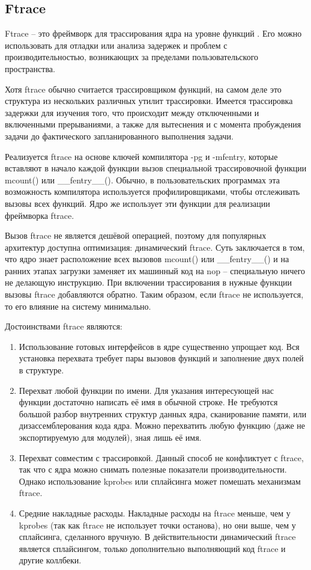 	\subsection*{Ftrace}
		Ftrace -- это фреймворк для трассирования ядра на уровне функций \cite{ftrace}.
		Его можно использовать для отладки или анализа задержек и проблем с производительностью, 
		возникающих за пределами пользовательского пространства.

		Хотя ftrace обычно считается трассировщиком функций, 
		на самом деле это структура из нескольких различных утилит трассировки. 
		Имеется трассировка задержки для изучения того, 
		что происходит между отключенными и включенными прерываниями, 
		а также для вытеснения и с момента пробуждения задачи до фактического запланированного выполнения задачи.
		
		Реализуется ftrace на основе ключей компилятора -pg и -mfentry, 
		которые вставляют в начало каждой функции вызов специальной трассировочной функции 
		mcount() или \_\_fentry\_\_(). 
		Обычно, в пользовательских программах эта возможность компилятора используется профилировщиками,
		чтобы отслеживать вызовы всех функций. Ядро же использует эти функции для реализации фреймворка ftrace.

		Вызов ftrace не является дешёвой операцией,
		поэтому для популярных архитектур доступна оптимизация: динамический ftrace. 
		Суть заключается в том, что ядро знает расположение всех вызовов mcount() или \_\_fentry\_\_() 
		и на ранних этапах загрузки заменяет их машинный код на nop -- специальную ничего не делающую инструкцию. 
		При включении трассирования в нужные функции вызовы ftrace добавляются обратно. 
		Таким образом, если ftrace не используется, то его влияние на систему минимально.

		Достоинствами ftrace являются:
		\begin{enumerate}
			\item Использование готовых интерфейсов в ядре существенно упрощает код. 
				Вся установка перехвата требует пары вызовов функций и заполнение двух полей в структуре.
			\item Перехват любой функции по имени. 
				Для указания интересующей нас функции достаточно написать её имя в обычной строке. 
				Не требуются большой разбор внутренних структур данных ядра, сканирование памяти, или дизассемблерования кода ядра.
				Можно перехватить любую функцию (даже не экспортируемую для модулей), зная лишь её имя.
			\item Перехват совместим с трассировкой.
				Данный способ не конфликтует с ftrace,
				так что с ядра можно снимать полезные показатели производительности. 
				Однако использование kprobes или сплайсинга может помешать механизмам ftrace.
			\item Средние накладные расходы. 
				Накладные расходы на ftrace меньше, чем у kprobes (так как ftrace не использует точки останова),
				но они выше, чем у сплайсинга, сделанного вручную. 
				В действительности динамический ftrace является сплайсингом, только дополнительно выполняющий код ftrace и другие коллбеки.
		\end{enumerate}

